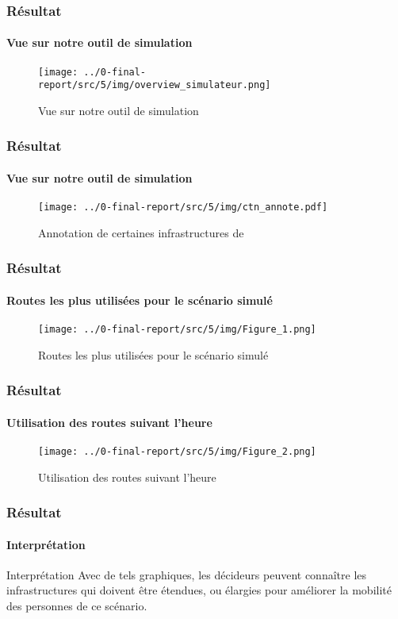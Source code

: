 \begin{frame}
    \frametitle{Résultat}
    \framesubtitle{Vue sur notre outil de simulation}

    \begin{figure}[h]
        \centering
        \texttt{[image: ../0-final-report/src/5/img/overview\_simulateur.png]}
        \caption{Vue sur notre outil de simulation}
        \label{fig:simulateur-overview}
    \end{figure}


\end{frame}

\begin{frame}
    \frametitle{Résultat}
    \framesubtitle{Vue sur notre outil de simulation}

    \begin{figure}[h]
        \centering
        \texttt{[image: ../0-final-report/src/5/img/ctn\_annote.pdf]}
        \caption{Annotation de certaines infrastructures de \ctn{}}
        \label{fig:ctn-anotated}
    \end{figure}

\end{frame}

\begin{frame}
    \frametitle{Résultat}
    \framesubtitle{Routes les plus utilisées pour le scénario simulé}

    \begin{figure}[h]
        \centering
        \texttt{[image: ../0-final-report/src/5/img/Figure\_1.png]}
        \caption{Routes les plus utilisées pour le scénario simulé}
        \label{fig:top_used_road}
    \end{figure}

\end{frame}
\begin{frame}
    \frametitle{Résultat}
    \framesubtitle{Utilisation des routes suivant l'heure}

    \begin{figure}[h]
        \centering
        \texttt{[image: ../0-final-report/src/5/img/Figure\_2.png]}
        \caption{Utilisation des routes suivant l'heure}
        \label{fig:road_usage_hour}
    \end{figure}

\end{frame}

\begin{frame}
    \frametitle{Résultat}
    \framesubtitle{Interprétation}

    \begin{block}{Interprétation}
        Avec de tels graphiques, les décideurs peuvent connaître les infrastructures qui doivent être étendues, ou élargies pour améliorer la mobilité des personnes de ce scénario.
    \end{block}
\end{frame}

